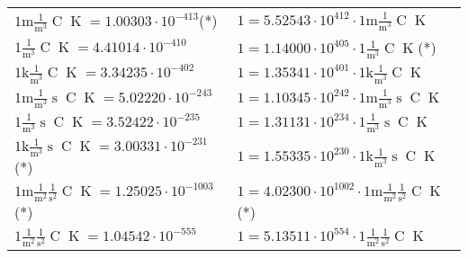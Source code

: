 \begin{center}
\begin{longtable}{l l}
{\color{gray}$1 \bm{\mathrm{ m}}\frac1{\operatorname{m}^3}{}{\operatorname{C}}{\operatorname{K}} = 1.00303\cdot10^{-413} $}\quad(*) & {\color{gray}$ 1 = 5.52543\cdot10^{412} \cdot 1 \bm{\mathrm{ m}}\frac1{\operatorname{m}^3}{}{\operatorname{C}}{\operatorname{K}}$}  \\
{\color{black}$1 \bm{\mathrm{ }}\frac1{\operatorname{m}^3}{}{\operatorname{C}}{\operatorname{K}} = 4.41014\cdot10^{-410} $}   & {\color{black}$ 1 = 1.14000\cdot10^{405} \cdot 1 \bm{\mathrm{ }}\frac1{\operatorname{m}^3}{}{\operatorname{C}}{\operatorname{K}}$}\quad(*)\\
{\color{gray}$1 \bm{\mathrm{ k}}\frac1{\operatorname{m}^3}{}{\operatorname{C}}{\operatorname{K}} = 3.34235\cdot10^{-402} $}   & {\color{gray}$ 1 = 1.35341\cdot10^{401} \cdot 1 \bm{\mathrm{ k}}\frac1{\operatorname{m}^3}{}{\operatorname{C}}{\operatorname{K}}$}  \\
{\color{gray}$1 \bm{\mathrm{ m}}\frac1{\operatorname{m}^3}{\operatorname{s}}{\operatorname{C}}{\operatorname{K}} = 5.02220\cdot10^{-243} $}   & {\color{gray}$ 1 = 1.10345\cdot10^{242} \cdot 1 \bm{\mathrm{ m}}\frac1{\operatorname{m}^3}{\operatorname{s}}{\operatorname{C}}{\operatorname{K}}$}  \\
{\color{black}$1 \bm{\mathrm{ }}\frac1{\operatorname{m}^3}{\operatorname{s}}{\operatorname{C}}{\operatorname{K}} = 3.52422\cdot10^{-235} $}   & {\color{black}$ 1 = 1.31131\cdot10^{234} \cdot 1 \bm{\mathrm{ }}\frac1{\operatorname{m}^3}{\operatorname{s}}{\operatorname{C}}{\operatorname{K}}$}  \\
{\color{gray}$1 \bm{\mathrm{ k}}\frac1{\operatorname{m}^3}{\operatorname{s}}{\operatorname{C}}{\operatorname{K}} = 3.00331\cdot10^{-231} $}\quad(*) & {\color{gray}$ 1 = 1.55335\cdot10^{230} \cdot 1 \bm{\mathrm{ k}}\frac1{\operatorname{m}^3}{\operatorname{s}}{\operatorname{C}}{\operatorname{K}}$}  \\
{\color{gray}$1 \bm{\mathrm{ m}}\frac1{\operatorname{m}^2}\frac1{\operatorname{s}^2}{\operatorname{C}}{\operatorname{K}} = 1.25025\cdot10^{-1003} $}\quad(*) & {\color{gray}$ 1 = 4.02300\cdot10^{1002} \cdot 1 \bm{\mathrm{ m}}\frac1{\operatorname{m}^2}\frac1{\operatorname{s}^2}{\operatorname{C}}{\operatorname{K}}$}\quad(*)\\
{\color{black}$1 \bm{\mathrm{ }}\frac1{\operatorname{m}^2}\frac1{\operatorname{s}^2}{\operatorname{C}}{\operatorname{K}} = 1.04542\cdot10^{-555} $}   & {\color{black}$ 1 = 5.13511\cdot10^{554} \cdot 1 \bm{\mathrm{ }}\frac1{\operatorname{m}^2}\frac1{\operatorname{s}^2}{\operatorname{C}}{\operatorname{K}}$}  \\

\end{longtable}
\end{center}
